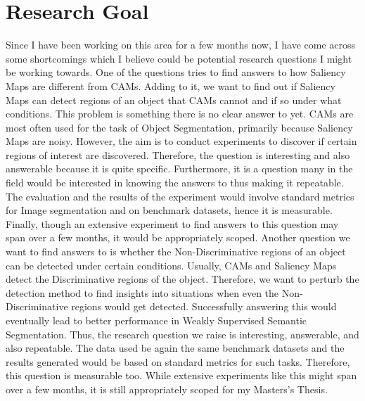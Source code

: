 \documentclass[11pt]{article}
\begin{document}
\section{Research Goal}
Since I have been working on this area for a few months now, I have come across some shortcomings which I believe could be potential research questions I might be working towards. \newline
One of the questions tries to find answers to how Saliency Maps are different from CAMs. Adding to it, we want to find out if Saliency Maps can detect regions of an object that CAMs cannot and if so under what conditions. This problem is something there is no clear answer to yet. CAMs are most often used for the task of Object Segmentation, primarily because Saliency Maps are noisy. However, the aim is to conduct experiments to discover if certain regions of interest are discovered. Therefore, the question is interesting and also answerable because it is quite specific. Furthermore, it is a question many in the field would be interested in knowing the answers to thus making it repeatable. The evaluation and the results of the experiment would involve standard metrics for Image segmentation and on benchmark datasets, hence it is measurable. Finally, though an extensive experiment to find answers to this question may span over a few months, it would be appropriately scoped. \newline
Another question we want to find answers to is whether the Non-Discriminative regions of an object can be detected under certain conditions. Usually, CAMs and Saliency Maps detect the Discriminative regions of the object. Therefore, we want to perturb the detection method to find insights into situations when even the Non-Discriminative regions would get detected. Successfully answering this would eventually lead to better performance in Weakly Supervised Semantic Segmentation. Thus, the research question we raise is interesting, answerable, and also repeatable. The data used be again the same benchmark datasets and the results generated would be based on standard metrics for such tasks. Therefore, this question is measurable too. While extensive experiments like this might span over a few months, it is still appropriately scoped for my Masters's Thesis.  
\end{document}
